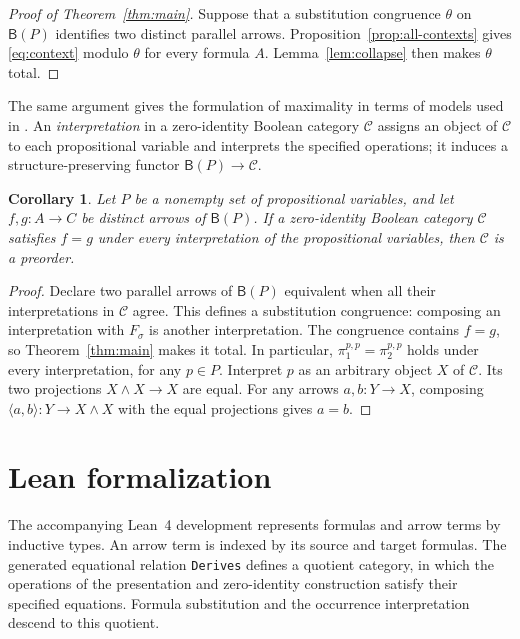 \documentclass[11pt]{article}
\newtheorem{corollary}[theorem]{Corollary}
\newcommand{\B}{\mathsf B}
\begin{document}
\begin{proof}[Proof of Theorem~\ref{thm:main}]
Suppose that a substitution congruence $\theta$ on $\B(P)$ identifies
two distinct parallel arrows. Proposition~\ref{prop:all-contexts}
gives \eqref{eq:context} modulo $\theta$ for every formula $A$.
Lemma~\ref{lem:collapse} then makes $\theta$ total.
\end{proof}

The same argument gives the formulation of maximality in terms of
models used in \cite[\S9.3, p.~194]{DP}. An \emph{interpretation} in
a zero-identity Boolean category $\mathcal C$ assigns an object of
$\mathcal C$ to each propositional variable and interprets the
specified operations; it induces a structure-preserving functor
$\B(P)\to\mathcal C$.

\begin{corollary}\label{cor:models}
Let $P$ be a nonempty set of propositional variables, and let
$f,g:A\to C$ be distinct arrows of $\B(P)$.
If a zero-identity Boolean category $\mathcal C$ satisfies $f=g$
under every interpretation of the propositional variables, then
$\mathcal C$ is a preorder.
\end{corollary}

\begin{proof}
Declare two parallel arrows of $\B(P)$ equivalent when all their
interpretations in $\mathcal C$ agree. This defines a substitution
congruence: composing an interpretation with $F_\sigma$ is another
interpretation. The congruence contains $f=g$, so
Theorem~\ref{thm:main} makes it total. In particular,
$\pi_1^{p,p}=\pi_2^{p,p}$ holds under every interpretation, for any
$p\in P$. Interpret $p$ as an arbitrary object $X$ of $\mathcal C$.
Its two projections $X\wedge X\to X$ are equal. For any arrows $a,b:Y\to X$, composing
$\langle a,b\rangle:Y\to X\wedge X$ with the equal projections gives $a=b$.
\end{proof}

\section{Lean formalization}\label{sec:formalization}

The accompanying Lean~4 development \cite{Formalization} represents
formulas and arrow terms by inductive types. An arrow term is indexed
by its source and target formulas. The generated equational relation
\texttt{Derives} defines a quotient category, in which the operations of
the presentation and zero-identity construction satisfy their
specified equations. Formula substitution and the occurrence interpretation
descend to this quotient.
\end{document}
